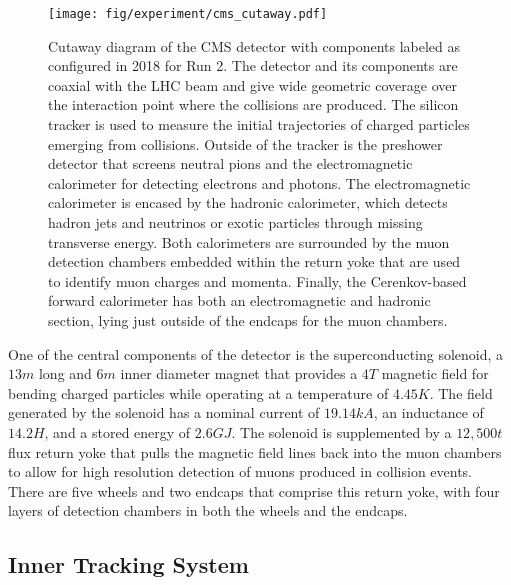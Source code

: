 \begin{figure}[htbp]
  \centering
  \texttt{[image: fig/experiment/cms\_cutaway.pdf]}
  \caption{
    Cutaway diagram of the CMS detector with components labeled as configured in 2018 for Run 2.
    The detector and its components are coaxial with the LHC beam and give wide geometric coverage over the interaction point where the collisions are produced.
    The silicon tracker is used to measure the initial trajectories of charged particles emerging from collisions.
    Outside of the tracker is the preshower detector that screens neutral pions and the electromagnetic calorimeter for detecting electrons and photons.
    The electromagnetic calorimeter is encased by the hadronic calorimeter, which detects hadron jets and neutrinos or exotic particles through missing transverse energy.
    Both calorimeters are surrounded by the muon detection chambers embedded within the return yoke that are used to identify muon charges and momenta.
    Finally, the Cerenkov-based forward calorimeter has both an electromagnetic and hadronic section, lying just outside of the endcaps for the muon chambers. %
  }
  \label{fig:CMScut}
\end{figure}

One of the central components of the detector is the superconducting solenoid, a $13\unit{m}$ long and $6\unit{m}$ inner diameter magnet that provides a $4\unit{T}$ magnetic field for bending charged particles while operating at a temperature of $4.45\unit{K}$.
The field generated by the solenoid has a nominal current of $19.14\unit{kA}$, an inductance of $14.2\unit{H}$, and a stored energy of $2.6\unit{GJ}$.
The solenoid is supplemented by a $12,500\unit{t}$ flux return yoke that pulls the magnetic field lines back into the muon chambers to allow for high resolution detection of muons produced in collision events.
There are five wheels and two endcaps that comprise this return yoke, with four layers of detection chambers in both the wheels and the endcaps.

\subsection{Inner Tracking System}
\label{subsec:tracking}


